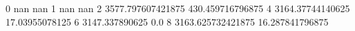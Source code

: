 0 nan nan
1 nan nan
2 3577.797607421875 430.459716796875
4 3164.37744140625 17.03955078125
6 3147.337890625 0.0
8 3163.625732421875 16.287841796875
